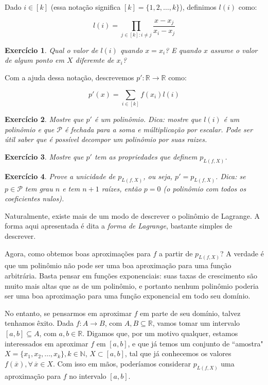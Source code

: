 \documentclass[]{article}
\newtheorem{exercicio}{Exercício}
\numberwithin{equation}{section}
\begin{document}
Dado $i \in [k]$ (essa notação significa $[k] = \{1, 2, \dots, k\}$), definimos $l(i)$ como:

$$
l(i) = \prod_{j \in [k] : i \neq j} \frac{x - x_j}{x_i - x_j}
$$

\begin{exercicio}
	Qual o valor de $l(i)$ quando $x = x_i$? E quando $x$ assume o valor de algum ponto em $X$ diferemte de $x_i$?
\end{exercicio}

Com a ajuda dessa notação, descrevemos $p' : \mathbb{R} \to \mathbb{R}$ como:

$$
p'(x) = \sum_{i \in [k]} f(x_i)l(i)
$$

\begin{exercicio}
	Mostre que $p'$ é um polinômio. Dica: mostre que $l(i)$ é um polinômio e que $\mathcal{P}$ é fechada para a soma e múltiplicação por escalar. Pode ser útil saber que é possível decompor um polinômio por suas raizes.
\end{exercicio}

\begin{exercicio}
	Mostre que $p'$ tem as propriedades que definem $p_{L(f, X)}$.
\end{exercicio}

\begin{exercicio}
	Prove a unicidade de $p_{L(f, X)}$, ou seja, $p' = p_{L(f, X)}$. Dica: se $p \in \mathcal{P}$ tem grau $n$ e tem $n + 1$ raízes, então $p = 0$ (o polinômio com todos os coeficientes nulos).
\end{exercicio}

Naturalmente, existe mais de um modo de descrever o polinômio de Lagrange. A forma aqui apresentada é dita a \emph{forma de Lagrange}, bastante simples de descrever.

Agora, como obtemos boas aproximações para $f$ a partir de $p_{L(f, X)}$? A verdade é que um polinômio não pode ser uma boa aproximação para uma função arbitrária. Basta pensar em funções exponenciais: suas taxas de crescimento são muito mais altas que as de um polinômio, e portanto nenhum polinômio poderia ser uma boa aproximação para uma função exponencial em todo seu domínio.

No entanto, se pensarmos em aproximar $f$ em parte de seu domínio, talvez tenhamos êxito. Dada $f : A \to B$, com $A, B \subseteq \mathbb{R}$, vamos tomar um intervalo $[a, b] \subseteq A$, com $a, b \in \mathbb{R}$. Digamos que, por um motivo qualquer, estamos interessados em aproximar $f$ em $[a, b]$, e que já temos um conjunto de ``amostra" $X = \{x_1, x_2, \dots, x_k\}, k \in \mathbb{N}$, $X \subset [a, b]$, tal que já conhecemos os valores $f(\overline{x}), \forall\, \overline{x} \in X$. Com isso em mãos, poderíamos considerar $p_{L(f, X)}$ uma aproximação para $f$ no intervalo $[a, b]$.
\end{document}
